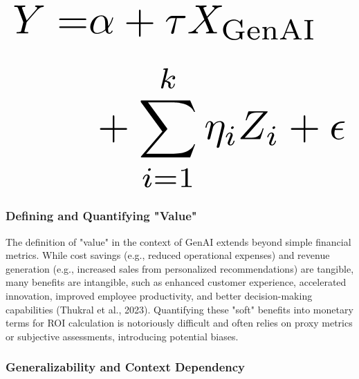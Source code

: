 \documentclass[10pt,journal,compsoc,twocolumn]{IEEEtran}
\begin{document}
\begin{equation}
\resizebox{\columnwidth}{!}{$\displaystyle
\begin{aligned}
Y = & \alpha + \tau X_{\text{GenAI}} \\
& + \sum_{i=1}^k \eta_i Z_i + \epsilon
\end{aligned}
$}
\end{equation}

















































\subsubsection{Defining and Quantifying "Value"}

The definition of "value" in the context of GenAI extends beyond simple financial metrics. While cost savings (e.g., reduced operational expenses) and revenue generation (e.g., increased sales from personalized recommendations) are tangible, many benefits are intangible, such as enhanced customer experience, accelerated innovation, improved employee productivity, and better decision-making capabilities (Thukral et al., 2023). Quantifying these "soft" benefits into monetary terms for ROI calculation is notoriously difficult and often relies on proxy metrics or subjective assessments, introducing potential biases.


\subsubsection{Generalizability and Context Dependency}
\end{document}
